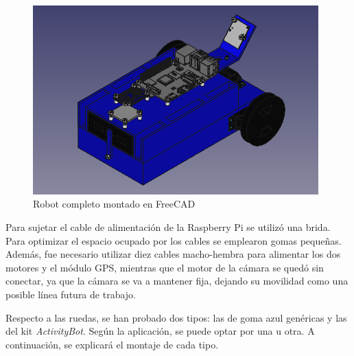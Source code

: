 \begin{figure} [h!]
	\begin{center}
		\includegraphics[width=11cm]{figs/cap5/completo3.png}
	\end{center}
	\caption{Robot completo montado en FreeCAD} 
	\label{fig:robotfreecad}
\end{figure}


Para sujetar el cable de alimentación de la Raspberry Pi se utilizó una brida. Para optimizar el espacio ocupado por los cables se emplearon gomas pequeñas. Además, fue necesario utilizar diez cables macho-hembra para alimentar los dos motores y el módulo \acs{GPS}, mientras que el motor de la cámara se quedó sin conectar, ya que la cámara se va a mantener fija, dejando su movilidad como una posible línea futura de trabajo.

Respecto a las ruedas, se han probado dos tipos: las de goma azul genéricas y las del kit \textit{ActivityBot}. Según la aplicación, se puede optar por una u otra. A continuación, se explicará el montaje de cada tipo.




